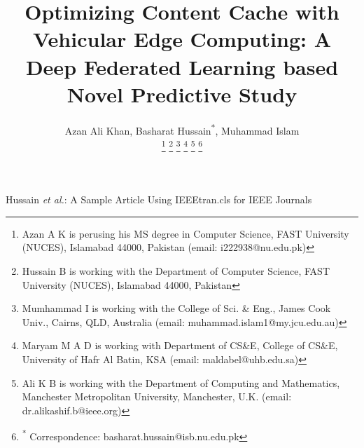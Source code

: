 \documentclass[journal]{IEEEtran}
\begin{document}
\small
%
\title{Optimizing Content Cache with Vehicular Edge Computing: A Deep Federated Learning based Novel Predictive Study}

\author{Azan Ali Khan, Basharat Hussain\textsuperscript{*}, Muhammad Islam

 \thanks{Azan A K is perusing his MS degree in Computer Science, FAST University (NUCES), Islamabad 44000, Pakistan (email: i222938@nu.edu.pk)} 
 \thanks{Hussain B is working with the Department of Computer Science, FAST University (NUCES), Islamabad 44000, Pakistan}
 \thanks{Mumhammad I is working with the College of Sci. \& Eng., James Cook Univ., Cairns, QLD, Australia (email: muhammad.islam1@my.jcu.edu.au)} 
  \thanks{Maryam M A D is working with Department of CS\&E, College of CS\&E, University of Hafr Al Batin, KSA (email: maldabel@uhb.edu.sa)} 
   \thanks{Ali K B is working with the Department of Computing and Mathematics, Manchester Metropolitan University, Manchester, U.K. (email: dr.alikashif.b@ieee.org)} 
\thanks{\textsuperscript{*} Correspondence: basharat.hussain@isb.nu.edu.pk}
}


\markboth{}%
{Hussain \MakeLowercase{\textit{et al.}}: A Sample Article Using IEEEtran.cls for IEEE Journals}
\maketitle

%
\end{document}
